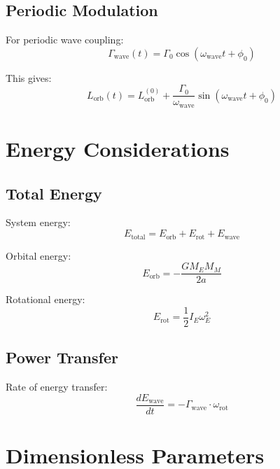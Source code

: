 \documentclass[12pt,a4paper]{article}
\begin{document}
\subsection{Periodic Modulation}

For periodic wave coupling:
\begin{equation}
\Gamma_{\text{wave}}(t) = \Gamma_0 \cos(\omega_{\text{wave}} t + \phi_0)
\label{eq:periodic_torque}
\end{equation}

This gives:
\begin{equation}
L_{\text{orb}}(t) = L_{\text{orb}}^{(0)} + \frac{\Gamma_0}{\omega_{\text{wave}}} \sin(\omega_{\text{wave}} t + \phi_0)
\label{eq:modulated_L}
\end{equation}

\section{Energy Considerations}

\subsection{Total Energy}

System energy:
\begin{equation}
E_{\text{total}} = E_{\text{orb}} + E_{\text{rot}} + E_{\text{wave}}
\label{eq:total_energy}
\end{equation}

Orbital energy:
\begin{equation}
E_{\text{orb}} = -\frac{GM_E M_M}{2a}
\label{eq:orbital_energy}
\end{equation}

Rotational energy:
\begin{equation}
E_{\text{rot}} = \frac{1}{2}I_E \omega_E^2
\label{eq:rotational_energy}
\end{equation}

\subsection{Power Transfer}

Rate of energy transfer:
\begin{equation}
\frac{dE_{\text{wave}}}{dt} = -\Gamma_{\text{wave}} \cdot \omega_{\text{rot}}
\label{eq:power_transfer}
\end{equation}

\section{Dimensionless Parameters}
\end{document}
